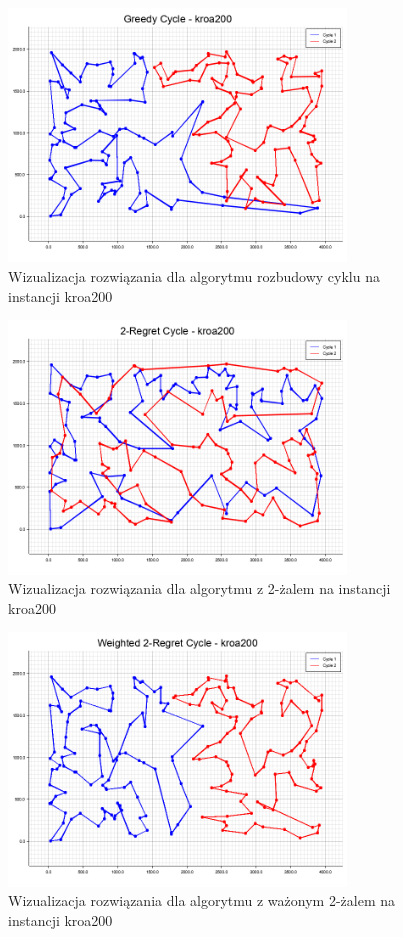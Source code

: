 \documentclass[12pt,a4paper]{article}
\begin{document}
\begin{figure}[H]
\centering
\includegraphics[width=0.8\textwidth]{figures/kroa200_Greedy_Cycle.png}
\caption{Wizualizacja rozwiązania dla algorytmu rozbudowy cyklu na instancji kroa200}
\end{figure}

\begin{figure}[H]
\centering
\includegraphics[width=0.8\textwidth]{figures/kroa200_2-Regret_Cycle.png}
\caption{Wizualizacja rozwiązania dla algorytmu z 2-żalem na instancji kroa200}
\end{figure}

\begin{figure}[H]
\centering
\includegraphics[width=0.8\textwidth]{figures/kroa200_Weighted_2-Regret_Cycle.png}
\caption{Wizualizacja rozwiązania dla algorytmu z ważonym 2-żalem na instancji kroa200}
\end{figure}
\end{document}
